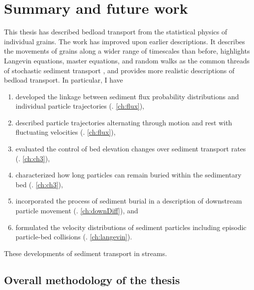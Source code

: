 
\chapter{Summary and future work}
\label{ch:conc}

This thesis has described bedload transport from the statistical physics of individual grains.
The work has improved upon earlier descriptions.
It describes the movements of grains along a wider range of timescales than before, highlights Langevin equations, master equations, and random walks as the common threads of stochastic sediment transport \DIFdelbegin {}\DIFdelend \DIFaddbegin {}\DIFaddend , and provides more realistic descriptions of bedload transport. In particular, I have
\begin{enumerate}
	\item developed the linkage between sediment flux probability distributions and individual particle trajectories (\DIFdelbegin {}\DIFdelend \DIFaddbegin {}\DIFaddend . \ref{ch:flux}), 
	\item described particle trajectories alternating through motion and rest with fluctuating velocities (\DIFdelbegin {}\DIFdelend \DIFaddbegin {}\DIFaddend . \ref{ch:flux}),
	\item evaluated the control of bed elevation changes over sediment transport rates (\DIFdelbegin {}\DIFdelend \DIFaddbegin {}\DIFaddend . \ref{ch:ch3}),
	\item characterized how long particles can remain buried within the sedimentary bed (\DIFdelbegin {}\DIFdelend \DIFaddbegin {}\DIFaddend . \ref{ch:ch3}),
	\item incorporated the process of sediment burial in a description of downstream particle movement (\DIFdelbegin {}\DIFdelend \DIFaddbegin {}\DIFaddend . \ref{ch:downDiff}), and
	\item formulated the velocity distributions of sediment particles including episodic particle-bed collisions (\DIFdelbegin {}\DIFdelend \DIFaddbegin {}\DIFaddend . \ref{ch:langevin}).
\end{enumerate}
These developments \DIFdelbegin {}\DIFdelend \DIFaddbegin {}\DIFaddend of sediment transport in streams.

\section{Overall methodology of the thesis}

